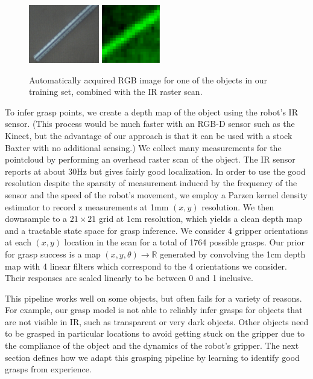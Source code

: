 \documentclass{article}
\begin{document}
\begin{figure}
  \centering
\includegraphics[height=1in]{figures/ruler_rgb.png}
\includegraphics[height=1in]{figures/ruler_ir.png}
\caption{Automatically acquired RGB image for one of the objects in our
  training set, combined with the IR raster scan.\label{fig:ir}}
\end{figure}

To infer grasp points, we create a depth map of the object using the
robot's IR sensor.  (This process would be much faster with an RGB-D
sensor such as the Kinect, but the advantage of our approach is that
it can be used with a stock Baxter with no additional sensing.)  We
collect many measurements for the pointcloud by performing an overhead
raster scan of the object. The IR sensor reports at about 30Hz but
gives fairly good localization.  In order to use the good resolution
despite the sparsity of measurement induced by the frequency of the
sensor and the speed of the robot's movement, we employ a Parzen
kernel density estimator to record z measurements at 1mm $(x,y)$
resolution. We then downsample to a $21 \times 21$ grid at 1cm
resolution, which yields a clean depth map and a tractable state space
for grasp inference. We consider 4 gripper orientations at each
$(x,y)$ location in the scan for a total of 1764 possible grasps. Our
prior for grasp success is a map $(x,y,\theta) \rightarrow \mathbb{R}$
generated by convolving the 1cm depth map with 4 linear filters which
correspond to the 4 orientations we consider. Their responses are
scaled linearly to be between 0 and 1 inclusive.

This pipeline works well on some objects, but often fails for a
variety of reasons.  For example, our grasp model is not able to 
reliably infer grasps for objects that are not visible in IR, such as
transparent or very dark objects.  Other objects need to be
grasped in particular locations to avoid getting stuck on the gripper
due to the compliance of the object and the dynamics of the robot's
gripper.  The next section defines how we adapt this grasping pipeline
by learning to identify good grasps from experience.
\end{document}
